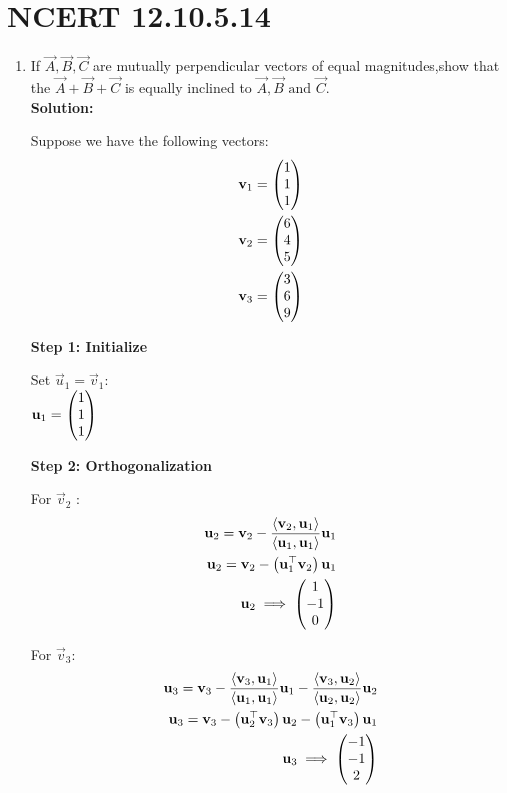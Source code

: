 \documentclass[11pt]{book}
\begin{document}
\section*{NCERT 12.10.5.14}
\begin{enumerate}
    \item If $ \vec{A},\vec{B},\vec{C} $ are mutually perpendicular vectors of equal magnitudes,show that the  $ \vec{A}+\vec{B}+\vec{C} $ is equally inclined to $ \vec{A},\vec{B}  \text{ and }  \vec{C} $.\\
    \textbf{Solution:}
    
    Suppose we have the following vectors:
    \begin{align*}
        \mathbf{v}_1 = \begin{pmatrix}1 \\1 \\1\end{pmatrix}  \\
        \mathbf{v}_2 = \begin{pmatrix}6\\ 4\\ 5\end{pmatrix}  \\
        \mathbf{v}_3 = \begin{pmatrix}3 \\6\\ 9\end{pmatrix}
    \end{align*}
        

\textbf{Step 1: Initialize}

Set $\vec{u}_1 = \vec{v}_1$:\\

 $\mathbf{u}_1 = \begin{pmatrix}1\\1\\1\end{pmatrix}$
 

\textbf{Step 2: Orthogonalization}

For  $ \vec{v}_2$ :
 \begin{align}
     \mathbf{u}_2 = \mathbf{v}_2 - \frac{\langle \mathbf{v}_2, \mathbf{u}_1 \rangle}{\langle \mathbf{u}_1, \mathbf{u}_1 \rangle} \mathbf{u}_1 \\
     \mathbf{u}_2=\mathbf{v}_2- \left(\mathbf{u}_1 ^\top \mathbf{v}_2\right) \mathbf{u}_1\\ 
     \mathbf{u}_2\implies \begin{pmatrix}1\\-1\\0\end{pmatrix}
 \end{align}

For $\vec{v}_3 $:
\begin{align}
    \mathbf{u}_3 = \mathbf{v}_3 - \frac{\langle \mathbf{v}_3, \mathbf{u}_1 \rangle}{\langle \mathbf{u}_1, \mathbf{u}_1 \rangle} \mathbf{u}_1 - \frac{\langle \mathbf{v}_3, \mathbf{u}_2 \rangle}{\langle \mathbf{u}_2, \mathbf{u}_2 \rangle} \mathbf{u}_2 \\
    \mathbf{u}_3=\mathbf{v}_3- \left(\mathbf{u}_2 ^\top \mathbf{v}_3\right) \mathbf{u}_2- \left(\mathbf{u}_1 ^\top \mathbf{v}_3\right) \mathbf{u}_1\\ 
\mathbf{u}_3\implies \begin{pmatrix}-1\\-1\\2\end{pmatrix}
\end{align}


\end{enumerate}
\end{document}
